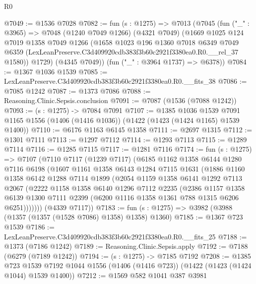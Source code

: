 \begin{lexlean}{R0}
\begin{coremodule}
@7049 := @1536 @7028
@7082 := fun (s : @1275) =>
  @7013
    (@7045
      (fun ("_" : @3965) =>
      @7048
        (@1240 @7049 @1266)
        (@4321 @7049)
        (@1669
          @1025
          @124
          @7019
          @1358
          @7049
          @1266
          (@1658
            @1023
            @196
            @1360
            @7018
            @6349
            @7049
            @6359
            (LexLeanPreserve.C3d409920cdb383f3b60c2921f3380ea0.R0.__rel_37 @1580))
          @1729)
        (@4345 @7049))
      (fun ("_" : @3964 @1737) => @6378))
@7084 := @1367 @1036 @1539
@7085 := LexLeanPreserve.C3d409920cdb383f3b60c2921f3380ea0.R0.__fits_38
@7086 := @7085 @1242
@7087 := @1373 @7086
@7088 := Reasoning.Clinic.Sepsis.conclusion
@7091 := @7087 (@1536 (@7088 @1242))
@7093 := (s : @1275) -> @7084 @7091
@7107 := @1385
    @1036
    @1539
    @7091
    @1165
    @1556
    (@1406 (@1416 @1036))
    (@1422 (@1423 (@1424 @1165) @1539 @1400))
@7110 := @6176 @1163 @6145 @1358
@7111 := @2697 @1315
@7112 := @1301 @7111
@7113 := @1297 @7112
@7114 := @1293 @7113
@7115 := @1289 @7114
@7116 := @1285 @7115
@7117 := @1281 @7116
@7174 := fun (s : @1275) =>
  @7107
    (@7110
      @7117
      (@1239 @7117)
      (@6185
        @1162
        @1358
        @6144
        @1280
        @7116
        @6198
        (@1607
          @1161
          @1358
          @6143
          @1284
          @7115
          @1631
          (@1886
            @1160
            @1358
            @6142
            @1288
            @7114
            @1899
            (@2054
              @1159
              @1358
              @6141
              @1292
              @7113
              @2067
              (@2222
                @1158
                @1358
                @6140
                @1296
                @7112
                @2235
                (@2386
                  @1157
                  @1358
                  @6139
                  @1300
                  @7111
                  @2399
                  (@6200 @1116 @1358 @1361 @788 @1315 @6206 @6251)))))))
      (@4339 @7117))
@7183 := fun (s : @1275) => @3982 (@3988 (@1357 (@1357 (@1528 @7086) @1358) @1358) @1360)
@7185 := @1367 @723 @1539
@7186 := LexLeanPreserve.C3d409920cdb383f3b60c2921f3380ea0.R0.__fits_25
@7188 := @1373 (@7186 @1242)
@7189 := Reasoning.Clinic.Sepsis.apply
@7192 := @7188 (@6279 (@7189 @1242))
@7194 := (s : @1275) -> @7185 @7192
@7208 := @1385
    @723
    @1539
    @7192
    @1044
    @1556
    (@1406 (@1416 @723))
    (@1422 (@1423 (@1424 @1044) @1539 @1400))
@7212 := @1569 @582 @1041 @387 @3981

\end{coremodule}
\end{lexlean}
